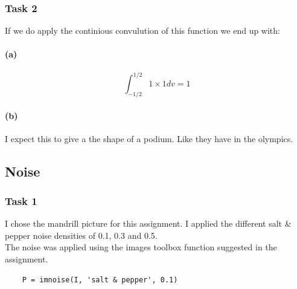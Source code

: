 \documentclass{article}
\begin{document}
\subsubsection*{Task 2}
If we do apply the continious convulution of this function we end up with:

\paragraph{(a)}
\begin{equation}
	\int_{-1/2}^{1/2} 1 \times 1 {d}v = 1
\end{equation}

\paragraph{(b)}
I expect this to give a the shape of a podium. Like they have in the olympics.

\newpage
\subsection{Noise}
\subsubsection*{Task 1}

I chose the mandrill picture for this assignment. I applied the different salt \& pepper noise densities of 0.1, 0.3 and 0.5. \\
The noise was applied using the images toolbox function suggested in the assignment.
\begin{lstlisting}
	P = imnoise(I, 'salt & pepper', 0.1)
\end{lstlisting}
\end{document}
